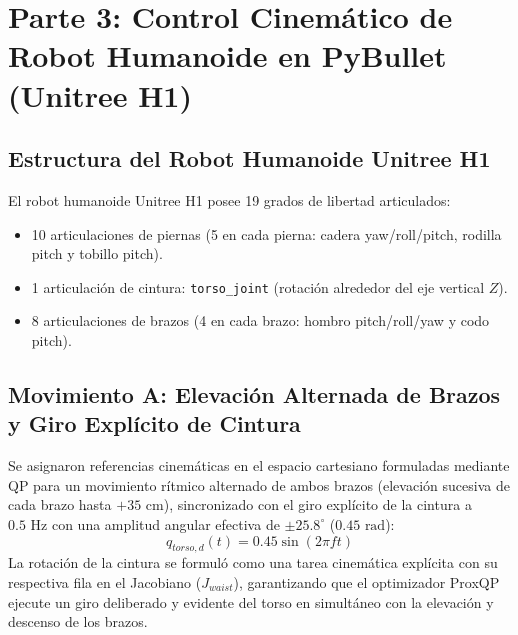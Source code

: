 \documentclass[11pt,a4paper]{article}
\begin{document}
\section{Parte 3: Control Cinemático de Robot Humanoide en PyBullet (Unitree H1)}

\subsection{Estructura del Robot Humanoide Unitree H1}
El robot humanoide Unitree H1 posee 19 grados de libertad articulados:
\begin{itemize}
    \item 10 articulaciones de piernas (5 en cada pierna: cadera yaw/roll/pitch, rodilla pitch y tobillo pitch).
    \item 1 articulación de cintura: \texttt{torso\_joint} (rotación alrededor del eje vertical $Z$).
    \item 8 articulaciones de brazos (4 en cada brazo: hombro pitch/roll/yaw y codo pitch).
\end{itemize}

\subsection{Movimiento A: Elevación Alternada de Brazos y Giro Explícito de Cintura}
Se asignaron referencias cinemáticas en el espacio cartesiano formuladas mediante QP para un movimiento rítmico alternado de ambos brazos (elevación sucesiva de cada brazo hasta $+35\text{ cm}$), sincronizado con el giro explícito de la cintura a $0.5\text{ Hz}$ con una amplitud angular efectiva de $\pm 25.8^\circ$ ($0.45\text{ rad}$):
\begin{equation}
q_{torso, d}(t) = 0.45 \sin(2\pi f t)
\end{equation}
La rotación de la cintura se formuló como una tarea cinemática explícita con su respectiva fila en el Jacobiano ($J_{waist}$), garantizando que el optimizador ProxQP ejecute un giro deliberado y evidente del torso en simultáneo con la elevación y descenso de los brazos.
\end{document}
